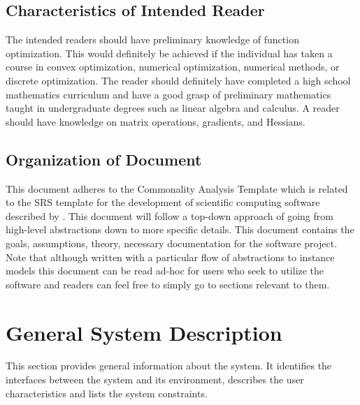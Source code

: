 \documentclass[12pt]{article}
\begin{document}



\subsection{Characteristics of Intended Reader} \label{sec_IntendedReader}
The intended readers should have preliminary knowledge of function optimization. This would definitely be achieved if the individual has taken a course in convex optimization, numerical optimization, numerical methods, or discrete optimization. The reader should definitely have completed a high school mathematics curriculum and have a good grasp of preliminary mathematics taught in undergraduate degrees such as linear algebra and calculus. A reader should have knowledge on matrix operations, gradients, and Hessians.
\\

\subsection{Organization of Document}
This document adheres to the  Commonality Analysis Template which is related to the SRS template for the development of scientific computing software described by \citep{l}. This document will follow a top-down approach of going from high-level abstractions down to more specific details. This document contains the goals, assumptions, theory, necessary documentation for the software project. Note that although written with a particular flow of abstractions to instance models this document can be read ad-hoc for users who seek to utilize the software and readers can feel free to simply go to sections relevant to them. 
\\



\section{General System Description}
This section provides general information about the system.  It identifies the
interfaces between the system and its environment, describes the user
characteristics and lists the system constraints.
\\
\end{document}

